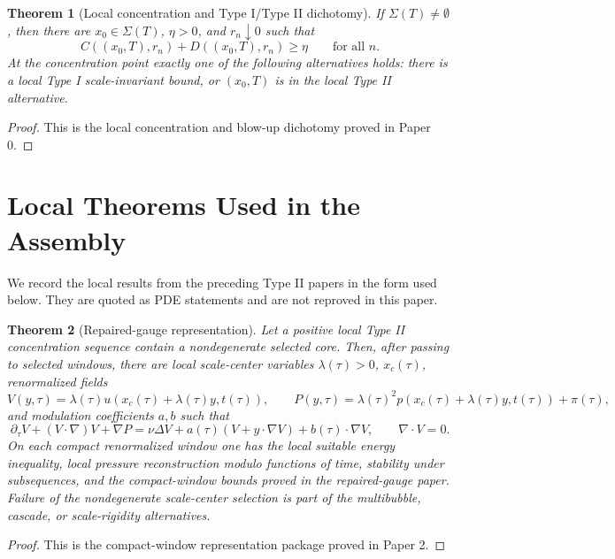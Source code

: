 \documentclass[11pt]{amsart}
\theoremstyle{plain}
\newtheorem{theorem}{Theorem}[section]
\theoremstyle{definition}
\theoremstyle{remark}
\begin{document}
\begin{theorem}[Local concentration and Type I/Type II dichotomy]
\label{thm:paper0}
If \(\Sigma(T)\ne\emptyset\), then there are
\(x_0\in\Sigma(T)\), \(\eta>0\), and \(r_n\downarrow0\) such that
\[
  C((x_0,T),r_n)+D((x_0,T),r_n)\ge\eta
  \qquad\text{for all }n.
\]
At the concentration point exactly one of the following alternatives holds:
there is a local Type I scale-invariant bound, or \((x_0,T)\) is in the local
Type II alternative.
\end{theorem}

\begin{proof}
This is the local concentration and blow-up dichotomy proved in Paper 0.
\end{proof}

\section{Local Theorems Used in the Assembly}

We record the local results from the preceding Type II papers in the form used
below.  They are quoted as PDE statements and are not reproved in this paper.

\begin{theorem}[Repaired-gauge representation]
\label{thm:representation}
Let a positive local Type II concentration sequence contain a nondegenerate
selected core.  Then, after passing to selected windows, there are local
scale-center variables \(\lambda(\tau)>0\), \(x_c(\tau)\), renormalized fields
\[
  V(y,\tau)=\lambda(\tau)u(x_c(\tau)+\lambda(\tau)y,t(\tau)),
  \qquad
  P(y,\tau)=\lambda(\tau)^2p(x_c(\tau)+\lambda(\tau)y,t(\tau))+\pi(\tau),
\]
and modulation coefficients \(a,b\) such that
\[
  \partial_\tau V+(V\cdot\nabla)V+\nabla P
  =
  \nu\Delta V+a(\tau)(V+y\cdot\nabla V)+b(\tau)\cdot\nabla V,
  \qquad \nabla\cdot V=0.
\]
On each compact renormalized window one has the local suitable energy
inequality, local pressure reconstruction modulo functions of time, stability
under subsequences, and the compact-window bounds proved in the repaired-gauge
paper.  Failure of the nondegenerate scale-center selection is part of the
multibubble, cascade, or scale-rigidity alternatives.
\end{theorem}

\begin{proof}
This is the compact-window representation package proved in Paper 2.
\end{proof}
\end{document}
